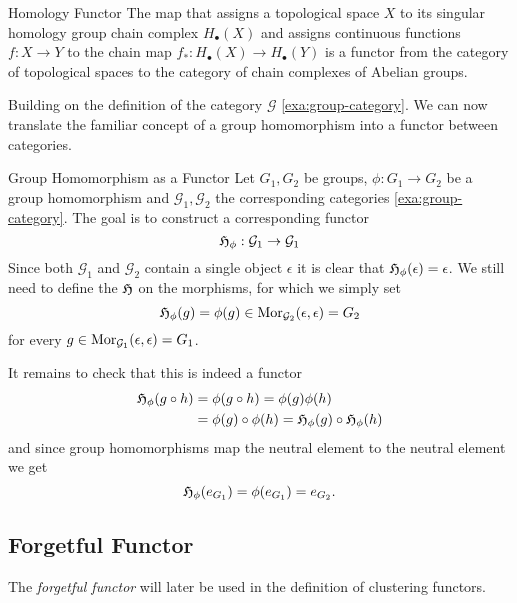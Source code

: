 \begin{example}{Homology Functor}{}
\cite{Hatcher2001}
The map that assigns a topological space $X$ to its singular homology group chain complex $H_\bullet(X)$ and assigns continuous functions $f: X \to Y$ to the chain map $f_*: H_\bullet(X) \to H_\bullet(Y)$ is a functor from the category of topological spaces to the category of chain complexes of Abelian groups.
\end{example}

Building on the definition of the category $\mathcal{G}$ \ref{exa:group-category}. We can now translate the familiar concept of a group homomorphism into a functor between categories.

\begin{example}{Group Homomorphism as a Functor}{}
Let $G_1, G_2$ be groups, $\phi: G_1 \to G_2$ be a group homomorphism and $\mathcal{G}_1,\mathcal{G}_2$ the corresponding categories \ref{exa:group-category}. The goal is to construct a corresponding functor 
$$
\mathfrak{H}_\phi: \mathcal{G}_1 \to \mathcal{G}_1
$$
Since both $\mathcal{G}_1$ and $\mathcal{G}_2$ contain a single object $\epsilon$ it is clear that $\mathfrak{H}_\phi(\epsilon) = \epsilon$. We still need to define the $\mathfrak{H}$ on the morphisms, for which we simply set
$$
\mathfrak{H}_\phi(g) = \phi(g) \in \mathrm {Mor}_{\mathcal{G}_2}(\epsilon, \epsilon) = G_2
$$
for every $g \in \mathrm {Mor}_{\mathcal{G}_1}(\epsilon, \epsilon) = G_1$. \par

\medskip It remains to check that this is indeed a functor
\begin{equation*}
\begin{split}
\mathfrak{H}_\phi(g \circ h) &= \phi(g \circ h) = \phi(g)\phi(h) \\
&= \phi(g) \circ \phi(h) = \mathfrak{H}_\phi(g) \circ \mathfrak{H}_\phi(h)
\end{split}
\end{equation*}
and since group homomorphisms map the neutral element to the neutral element we get
\begin{equation*}
\mathfrak{H}_\phi(e_{G_1}) = \phi(e_{G_1}) = e_{G_2}.
\end{equation*}
\end{example}

\subsection{Forgetful Functor}
The \emph{forgetful functor} will later be used in the definition of clustering functors.

